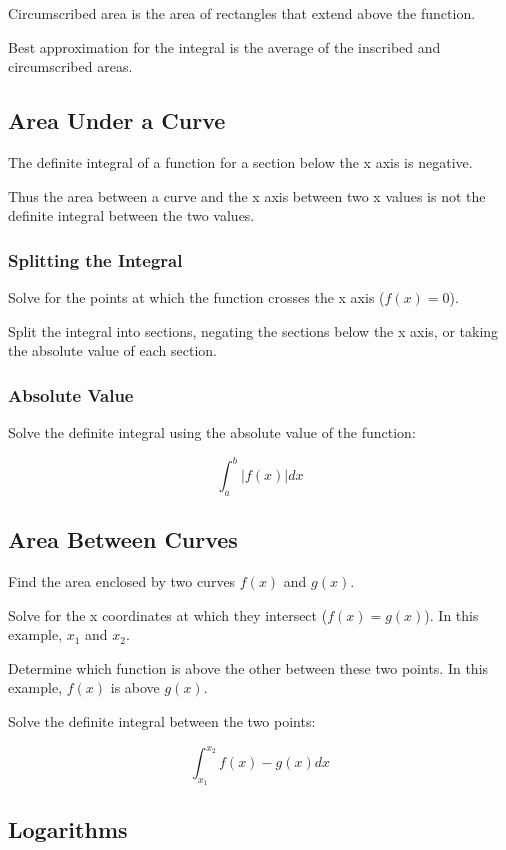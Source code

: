 \documentclass[a4paper,11pt]{article}
\begin{document}
Circumscribed area is the area of rectangles that extend above the function.

Best approximation for the integral is the average of the inscribed and
circumscribed areas.


\subsection{Area Under a Curve}

The definite integral of a function for a section below the x axis is negative.

Thus the area between a curve and the x axis between two x values is not the
definite integral between the two values.


\subsubsection{Splitting the Integral}

Solve for the points at which the function crosses the x axis ($f(x) = 0$).

Split the integral into sections, negating the sections below the x axis, or
taking the absolute value of each section.


\subsubsection{Absolute Value}

Solve the definite integral using the absolute value of the function:

$$
\int_a^b \lvert f(x) \rvert dx
$$


\subsection{Area Between Curves}

Find the area enclosed by two curves $f(x)$ and $g(x)$.

Solve for the x coordinates at which they intersect ($f(x) = g(x)$). In this
example, $x_1$ and $x_2$.

Determine which function is above the other between these two points. In this
example, $f(x)$ is above $g(x)$.

Solve the definite integral between the two points:

$$
\int_{x_1}^{x_2} f(x) - g(x) dx
$$


\subsection{Logarithms}
\end{document}
